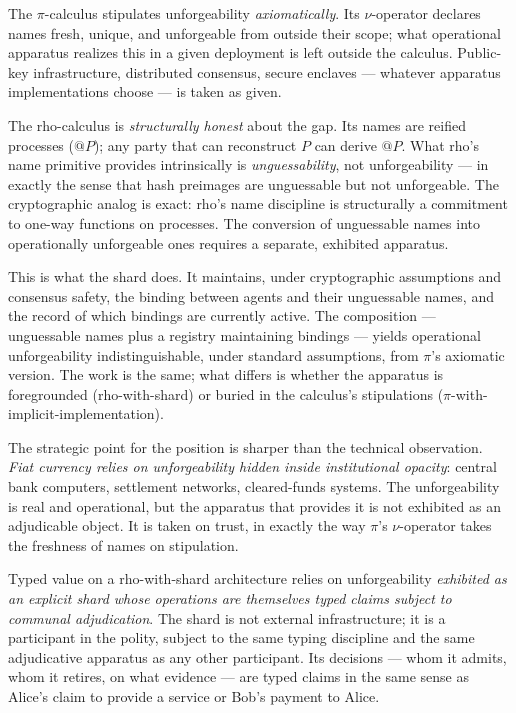 \documentclass[11pt]{article}
\begin{document}
The $\pi$-calculus stipulates unforgeability \emph{axiomatically}. Its $\nu$-operator declares names fresh, unique, and unforgeable from outside their scope; what operational apparatus realizes this in a given deployment is left outside the calculus. Public-key infrastructure, distributed consensus, secure enclaves --- whatever apparatus implementations choose --- is taken as given.

The rho-calculus is \emph{structurally honest} about the gap. Its names are reified processes ($@P$); any party that can reconstruct $P$ can derive $@P$. What rho's name primitive provides intrinsically is \emph{unguessability}, not unforgeability --- in exactly the sense that hash preimages are unguessable but not unforgeable. The cryptographic analog is exact: rho's name discipline is structurally a commitment to one-way functions on processes. The conversion of unguessable names into operationally unforgeable ones requires a separate, exhibited apparatus.

This is what the shard does. It maintains, under cryptographic assumptions and consensus safety, the binding between agents and their unguessable names, and the record of which bindings are currently active. The composition --- unguessable names plus a registry maintaining bindings --- yields operational unforgeability indistinguishable, under standard assumptions, from $\pi$'s axiomatic version. The work is the same; what differs is whether the apparatus is foregrounded (rho-with-shard) or buried in the calculus's stipulations ($\pi$-with-implicit-implementation).

The strategic point for the position is sharper than the technical observation. \emph{Fiat currency relies on unforgeability hidden inside institutional opacity}: central bank computers, settlement networks, cleared-funds systems. The unforgeability is real and operational, but the apparatus that provides it is not exhibited as an adjudicable object. It is taken on trust, in exactly the way $\pi$'s $\nu$-operator takes the freshness of names on stipulation.

Typed value on a rho-with-shard architecture relies on unforgeability \emph{exhibited as an explicit shard whose operations are themselves typed claims subject to communal adjudication}. The shard is not external infrastructure; it is a participant in the polity, subject to the same typing discipline and the same adjudicative apparatus as any other participant. Its decisions --- whom it admits, whom it retires, on what evidence --- are typed claims in the same sense as Alice's claim to provide a service or Bob's payment to Alice.
\end{document}
